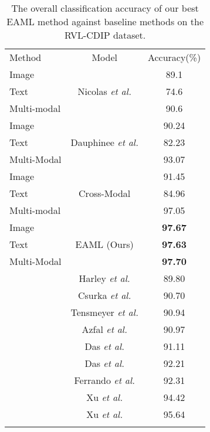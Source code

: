 \documentclass[twocolumn]{svjour3}
\newcommand{\etal}{\textit{et al.}}
\begin{document}
\begin{table}[tbh]
\small
\centering
\caption{The overall classification accuracy of our best EAML method against baseline methods on the RVL-CDIP dataset.}
    \begin{tabular}{lcc}
    \hline\noalign{\smallskip}
     Method & Model & Accuracy(\%)\\
     \noalign{\smallskip}\hline\noalign{\smallskip}
    Image & \multirow{3}{*}{Nicolas \etal \cite{audebert2019multimodal}} & 89.1\\
    Text && 74.6\\
    Multi-modal && 90.6\\
    \noalign{\smallskip}\hline\noalign{\smallskip}
    Image & \multirow{3}{*}{Dauphinee \etal \cite{Dauphinee2019ModularMA}} & 90.24\\
    Text && 82.23\\
    Multi-Modal && 93.07\\
    \noalign{\smallskip}\hline\noalign{\smallskip}
    Image & \multirow{3}{*}{Cross-Modal \cite{souhailbakkali}} & 91.45\\
    Text && 84.96\\
    Multi-modal && 97.05\\
    \noalign{\smallskip}\hline\noalign{\smallskip}
    Image & \multirow{3}{*}{EAML (Ours)} & \textbf{97.67}\\
    Text && \textbf{97.63}\\
    Multi-Modal && \textbf{97.70}\\
    \noalign{\smallskip}\hline\noalign{\smallskip}
    \multirow{8}{*}{Baselines} 
    & Harley \etal \cite{Harley2015EvaluationOD} & 89.80\\
    & Csurka \etal \cite{Csurka2016WhatIT} & 90.70\\
    & Tensmeyer \etal \cite{tensmeyer2017analysis} & 90.94\\
    & Azfal \etal \cite{Afzal2017CuttingTE} & 90.97\\
    & Das \etal \cite{8545630} & 91.11\\
    & Das \etal \cite{8545630} & 92.21\\
    & Ferrando \etal \cite{Ferrando2020ImprovingAA} & 92.31\\
    & Xu \etal \cite{Xu2020LayoutLMPO} & 94.42\\
    & Xu \etal \cite{Xu2020LayoutLMv2MP} & 95.64\\
    \noalign{\smallskip}\hline
    \end{tabular}
    \label{tab:Comparisontable}
\end{table}
\end{document}
